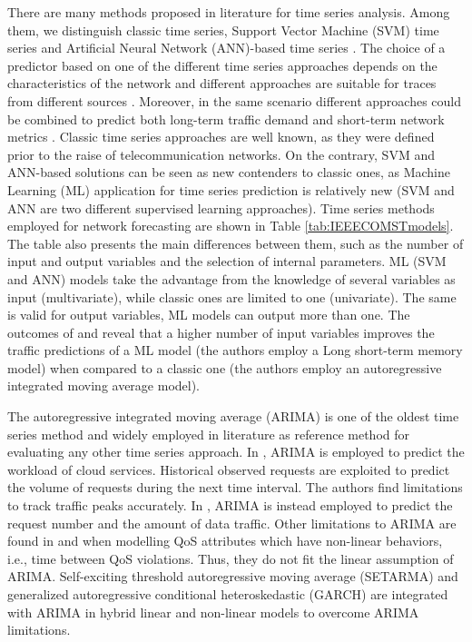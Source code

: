 There are many methods proposed in literature for time series analysis.
Among them, we distinguish classic time series, Support Vector Machine (SVM) time series and Artificial Neural Network (ANN)-based time series \cite{Sapankevych2009}. The choice of a predictor based on one of the different time series approaches depends on the characteristics of the network and different approaches are suitable for traces from different sources \cite{Iqbal2019}. Moreover, in the same scenario different approaches could be combined to predict both long-term traffic demand and short-term network metrics \cite{Kryftis2015}.
Classic time series approaches are well known, as they were defined prior to the raise of telecommunication networks. On the contrary, SVM and ANN-based solutions can be seen as new contenders to classic ones, as Machine Learning (ML) application for time series prediction \cite{Bontempi2012} is relatively new (SVM and ANN are two different supervised learning approaches). Time series methods employed for network forecasting are shown in Table \ref{tab:IEEECOMSTmodels}. The table also presents the main differences between them, such as the number of input and output variables and the selection of internal parameters. ML (SVM and ANN) models take the advantage from the knowledge of several variables as input (multivariate), while classic ones are limited to one (univariate). The same is valid for output variables, ML models can output more than one. The outcomes of \cite{azari2019} and \cite{azari2019-2} reveal that a higher number of input variables improves the traffic predictions of a ML model (the authors employ a Long short-term memory model) when compared to a classic one (the authors employ an autoregressive integrated moving average model).


The autoregressive integrated moving average (ARIMA) \cite{Hyndman2018} is one of the oldest time series method and widely employed in literature as reference method for evaluating any other time series approach. In \cite{calheiros2014}, ARIMA is employed to predict the workload of cloud services. Historical observed requests are exploited to predict the volume of requests during the next time interval. The authors find limitations to track traffic peaks accurately. In \cite{Wang2017-2}, ARIMA is instead employed to predict the request number and the amount of data traffic. Other limitations to ARIMA are found in \cite{amin2012} and \cite{amin2012-2} when modelling QoS attributes which have non-linear behaviors, i.e., time between QoS violations. Thus, they do not fit the linear assumption of ARIMA. Self-exciting threshold autoregressive moving average (SETARMA) \cite{amin2012} and generalized autoregressive conditional heteroskedastic (GARCH) \cite{amin2012-2} are integrated with ARIMA in hybrid linear and non-linear models to overcome ARIMA limitations.

